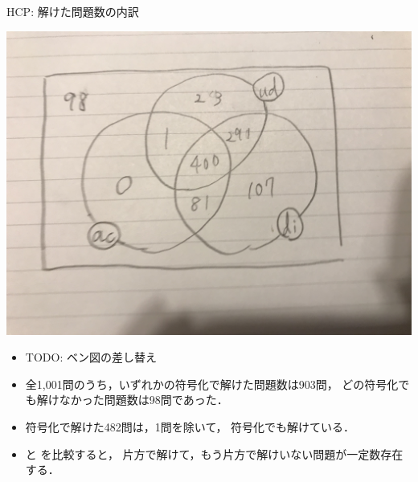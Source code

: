\documentclass[dvipdfmx]{beamer}
\begin{document}
\begin{frame}[shrink]{HCP: 解けた問題数の内訳}
  
\begin{center}
\includegraphics[width=0.5\linewidth]{fig/venn.jpeg}
\end{center}
\vfill
\begin{itemize}
\item \alert{TODO: ベン図の差し替え}
\item 全1,001問のうち，いずれかの符号化で解けた問題数は903問，
  どの符号化でも解けなかった問題数は98問であった．
\item {} 符号化で解けた482問は，1問を除いて，
   符号化でも解けている．
\item {} と  を比較すると，
  片方で解けて，もう片方で解けいない問題が一定数存在する．
\end{itemize}
\end{frame}
\end{document}
